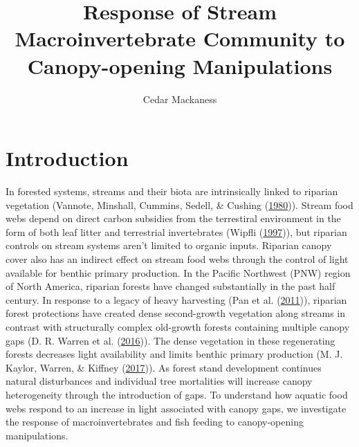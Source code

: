 \documentclass[double,12pt]{beavtex}
\title{Response of Stream Macroinvertebrate Community to Canopy-opening
Manipulations} %
\author{Cedar Mackaness} %
\begin{document}
\maketitle
\mainmatter


  \chapter*{Introduction}\label{introduction}
  
  In forested systems, streams and their biota are intrinsically linked to
  riparian vegetation (Vannote, Minshall, Cummins, Sedell, \& Cushing
  (\protect\hyperlink{ref-Vannote1980}{1980})). Stream food webs depend on
  direct carbon subsidies from the terrestiral environment in the form of
  both leaf litter and terrestrial invertebrates (Wipfli
  (\protect\hyperlink{ref-Wipfli1997}{1997})), but riparian controls on
  stream systems aren't limited to organic inputs. Riparian canopy cover
  also has an indirect effect on stream food webs through the control of
  light available for benthic primary production. In the Pacific Northwest
  (PNW) region of North America, riparian forests have changed
  substantially in the past half century. In response to a legacy of heavy
  harvesting (Pan et al. (\protect\hyperlink{ref-Pan2011}{2011})),
  riparian forest protections have created dense second-growth vegetation
  along streams in contrast with structurally complex old-growth forests
  containing multiple canopy gaps (D. R. Warren et al.
  (\protect\hyperlink{ref-Warren2016}{2016})). The dense vegetation in
  these regenerating forests decreases light availability and limits
  benthic primary production (M. J. Kaylor, Warren, \& Kiffney
  (\protect\hyperlink{ref-Kaylor2017FS}{2017})). As forest stand
  development continues natural disturbances and individual tree
  mortalities will increase canopy heterogeneity through the introduction
  of gaps. To understand how aquatic food webs respond to an increase in
  light associated with canopy gaps, we investigate the response of
  macroinvertebrates and fish feeding to canopy-opening manipulations.
  
\end{document}
